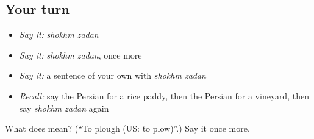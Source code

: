 \subsection*{Your turn}
\begin{itemize}
\raggedright
  \item \emph{Say it:} \emph{shokhm zadan}
  \item \emph{Say it:} \emph{shokhm zadan}, once more
  \item \emph{Say it:} a sentence of your own with \emph{shokhm zadan}
  \item \emph{Recall:} say the Persian for a rice paddy, then the Persian for a vineyard, then say \emph{shokhm zadan} again
\end{itemize}

\begin{tcolorbox}[breakable,colback=teal!4,colframe=teal!35!black,title={Before you move on}]
What does   mean? (\textquotedblleft{}To plough (US: to plow)\textquotedblright{}.) Say it once more.
\end{tcolorbox}
